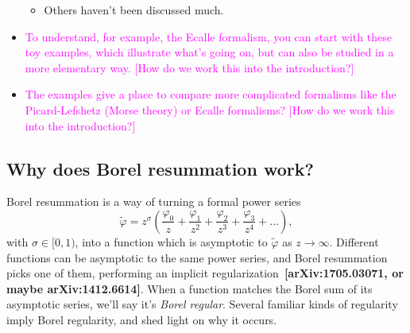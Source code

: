 \documentclass{article}
\newcommand{\series}{\tilde}
\begin{document}
\begin{itemize}
\begin{itemize}
\item Others haven't been discussed much.
\end{itemize}
\item \textcolor{magenta}{To understand, for example, the Ecalle formalism, you can start with these toy examples, which illustrate what's going on, but can also be studied in a more elementary way. [How do we work this into the introduction?]}
\item \textcolor{magenta}{The examples give a place to compare more complicated formalisms like the Picard-Lefshetz (Morse theory) or Ecalle formalisms? [How do we work this into the introduction?]}
\end{itemize}
\color{DarkBlue}
\subsection{Why does Borel resummation work?}
Borel resummation is a way of turning a formal power series
\[ \series{\varphi} = z^\sigma \left( \frac{\varphi_0}{z} + \frac{\varphi_1}{z^2} + \frac{\varphi_2}{z^3} + \frac{\varphi_3}{z^4} + \ldots \right), \]
with $\sigma \in [0, 1)$, into a function which is asymptotic to $\series{\varphi}$ as $z \to \infty$. Different functions can be asymptotic to the same power series, and Borel resummation picks one of them, performing an implicit regularization~\textbf{[arXiv:1705.03071, or maybe arXiv:1412.6614]}. When a function matches the Borel sum of its asymptotic series, we'll say it's {\em Borel regular}. Several familiar kinds of regularity imply Borel regularity, and shed light on why it occurs.
\end{document}
